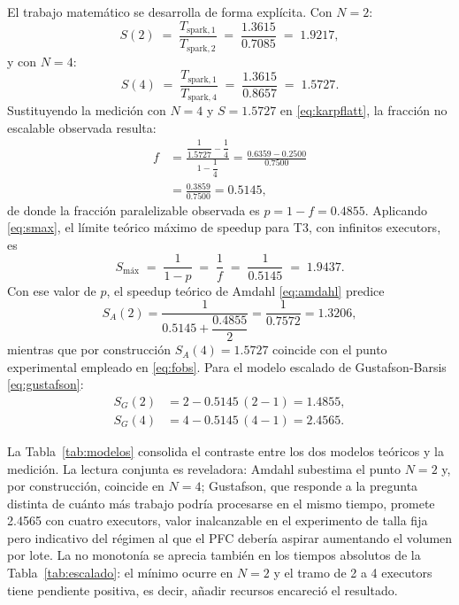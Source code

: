 \documentclass[10pt,journal]{IEEEtran}
\begin{document}
El trabajo matem\'atico se desarrolla de forma expl\'icita. Con $N = 2$:
\begin{equation}
S(2) \;=\; \frac{T_{\text{spark},1}}{T_{\text{spark},2}}
\;=\; \frac{\num{1.3615}}{\num{0.7085}} \;=\; \num{1.9217},
\label{eq:s2}
\end{equation}
y con $N = 4$:
\begin{equation}
S(4) \;=\; \frac{T_{\text{spark},1}}{T_{\text{spark},4}}
\;=\; \frac{\num{1.3615}}{\num{0.8657}} \;=\; \num{1.5727}.
\label{eq:s4}
\end{equation}
Sustituyendo la medici\'on con $N = 4$ y $S = \num{1.5727}$ en
\eqref{eq:karpflatt}, la fracci\'on no escalable observada resulta:
\begin{align}
f &= \frac{\dfrac{1}{\num{1.5727}} - \dfrac{1}{4}}{1 - \dfrac{1}{4}}
   = \frac{\num{0.6359} - \num{0.2500}}{\num{0.7500}} \nonumber\\
  &= \frac{\num{0.3859}}{\num{0.7500}}
   = \num{0.5145},
\label{eq:fobs}
\end{align}
de donde la fracci\'on paralelizable observada es
$p = 1 - f = \num{0.4855}$. Aplicando \eqref{eq:smax}, el l\'imite te\'orico
m\'aximo de speedup para T3, con infinitos executors, es
\begin{equation}
S_{\text{m\'ax}} \;=\; \frac{1}{1-p} \;=\; \frac{1}{f}
\;=\; \frac{1}{\num{0.5145}} \;=\; \num{1.9437}.
\label{eq:smaxT3}
\end{equation}
Con ese valor de $p$, el speedup te\'orico de Amdahl \eqref{eq:amdahl} predice
\begin{equation}
S_A(2) = \frac{1}{\num{0.5145} + \dfrac{\num{0.4855}}{2}}
       = \frac{1}{\num{0.7572}} = \num{1.3206},
\label{eq:sa2}
\end{equation}
mientras que por construcci\'on $S_A(4) = \num{1.5727}$ coincide con el punto
experimental empleado en \eqref{eq:fobs}. Para el modelo escalado de
Gustafson-Barsis \eqref{eq:gustafson}:
\begin{align}
S_G(2) &= 2 - \num{0.5145}\,(2-1) = \num{1.4855},
\label{eq:sg2}\\
S_G(4) &= 4 - \num{0.5145}\,(4-1) = \num{2.4565}.
\label{eq:sg4}
\end{align}

La Tabla~\ref{tab:modelos} consolida el contraste entre los dos modelos
te\'oricos y la medici\'on. La lectura conjunta es reveladora: Amdahl subestima
el punto $N=2$ y, por construcci\'on, coincide en $N=4$; Gustafson, que
responde a la pregunta distinta de cu\'anto m\'as trabajo podr\'ia procesarse
en el mismo tiempo, promete \num{2.4565} con cuatro executors, valor
inalcanzable en el experimento de talla fija pero indicativo del r\'egimen al
que el PFC deber\'ia aspirar aumentando el volumen por lote. La no monoton\'ia se aprecia
tambi\'en en los tiempos absolutos de la Tabla~\ref{tab:escalado}: el m\'inimo
ocurre en $N=2$ y el tramo de 2 a 4 executors tiene pendiente positiva, es
decir, a\~nadir recursos encareci\'o el resultado.
\end{document}
